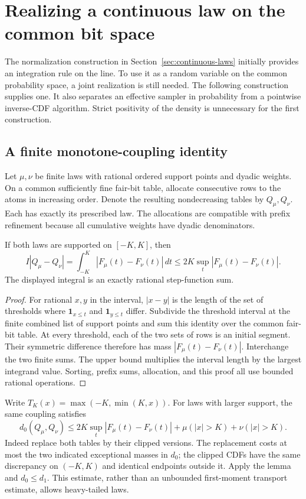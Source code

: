 \section{Realizing a continuous law on the common bit space}
\label{sec:realization}

The normalization construction in Section~\ref{sec:continuous-laws} initially
provides an integration rule on the line. To use it as a random variable on
the common probability space, a joint realization is still needed. The
following construction supplies one. It also separates an effective sampler
in probability from a pointwise inverse-CDF algorithm. Strict positivity of
the density is unnecessary for the first construction.

\subsection{A finite monotone-coupling identity}

Let $\mu,\nu$ be finite laws with rational ordered support points and dyadic
weights. On a common sufficiently fine fair-bit table, allocate consecutive
rows to the atoms in increasing order. Denote the resulting nondecreasing
tables by $Q_\mu,Q_\nu$. Each has exactly its prescribed law. The allocations
are compatible with prefix refinement because all cumulative weights have
dyadic denominators.

\begin{lemma}\label{lem:monotone-coupling}
If both laws are supported on $[-K,K]$, then
\[
 I|Q_\mu-Q_\nu|
   =\int_{-K}^{K}|F_\mu(t)-F_\nu(t)|\,dt
   \le 2K\sup_t|F_\mu(t)-F_\nu(t)|.
\]
The displayed integral is an exactly rational step-function sum.
\end{lemma}
\begin{proof}
For rational $x,y$ in the interval,
$|x-y|$ is the length of the set of thresholds where
$\mathbf1_{x\le t}$ and $\mathbf1_{y\le t}$ differ. Subdivide the threshold
interval at the finite combined list of support points and sum this identity
over the common fair-bit table. At every threshold, each of the two sets of
rows is an initial segment. Their symmetric difference therefore has mass
$|F_\mu(t)-F_\nu(t)|$. Interchange the two finite sums. The upper bound
multiplies the interval length by the largest integrand value. Sorting,
prefix sums, allocation, and this proof all use bounded rational operations.
\end{proof}

Write $T_K(x)=\max(-K,\min(K,x))$. For laws with larger support, the
same coupling satisfies
\begin{equation}\label{eq:coupling-clipped}
 d_0(Q_\mu,Q_\nu)
 \le 2K\sup_t|F_\mu(t)-F_\nu(t)|
       +\mu(|x|>K)+\nu(|x|>K).
\end{equation}
Indeed replace both tables by their clipped versions. The replacement costs
at most the two indicated exceptional masses in $d_0$; the clipped CDFs
have the same discrepancy on $(-K,K)$ and identical endpoints outside it.
Apply the lemma and $d_0\le d_1$. This estimate, rather than an unbounded
first-moment transport estimate, allows heavy-tailed laws.

